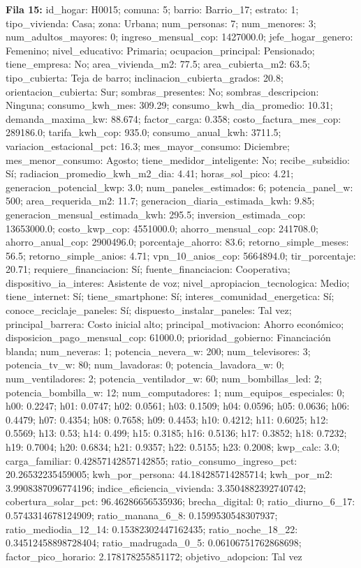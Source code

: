 {\footnotesize\textbf{Fila 15:} id\_hogar: H0015; comuna: 5; barrio: Barrio\_17; estrato: 1; tipo\_vivienda: Casa; zona: Urbana; num\_personas: 7; num\_menores: 3; num\_adultos\_mayores: 0; ingreso\_mensual\_cop: 1427000.0; jefe\_hogar\_genero: Femenino; nivel\_educativo: Primaria; ocupacion\_principal: Pensionado; tiene\_empresa: No; area\_vivienda\_m2: 77.5; area\_cubierta\_m2: 63.5; tipo\_cubierta: Teja de barro; inclinacion\_cubierta\_grados: 20.8; orientacion\_cubierta: Sur; sombras\_presentes: No; sombras\_descripcion: Ninguna; consumo\_kwh\_mes: 309.29; consumo\_kwh\_dia\_promedio: 10.31; demanda\_maxima\_kw: 88.674; factor\_carga: 0.358; costo\_factura\_mes\_cop: 289186.0; tarifa\_kwh\_cop: 935.0; consumo\_anual\_kwh: 3711.5; variacion\_estacional\_pct: 16.3; mes\_mayor\_consumo: Diciembre; mes\_menor\_consumo: Agosto; tiene\_medidor\_inteligente: No; recibe\_subsidio: Sí; radiacion\_promedio\_kwh\_m2\_dia: 4.41; horas\_sol\_pico: 4.21; generacion\_potencial\_kwp: 3.0; num\_paneles\_estimados: 6; potencia\_panel\_w: 500; area\_requerida\_m2: 11.7; generacion\_diaria\_estimada\_kwh: 9.85; generacion\_mensual\_estimada\_kwh: 295.5; inversion\_estimada\_cop: 13653000.0; costo\_kwp\_cop: 4551000.0; ahorro\_mensual\_cop: 241708.0; ahorro\_anual\_cop: 2900496.0; porcentaje\_ahorro: 83.6; retorno\_simple\_meses: 56.5; retorno\_simple\_anios: 4.71; vpn\_10\_anios\_cop: 5664894.0; tir\_porcentaje: 20.71; requiere\_financiacion: Sí; fuente\_financiacion: Cooperativa; dispositivo\_ia\_interes: Asistente de voz; nivel\_apropiacion\_tecnologica: Medio; tiene\_internet: Sí; tiene\_smartphone: Sí; interes\_comunidad\_energetica: Sí; conoce\_reciclaje\_paneles: Sí; dispuesto\_instalar\_paneles: Tal vez; principal\_barrera: Costo inicial alto; principal\_motivacion: Ahorro económico; disposicion\_pago\_mensual\_cop: 61000.0; prioridad\_gobierno: Financiación blanda; num\_neveras: 1; potencia\_nevera\_w: 200; num\_televisores: 3; potencia\_tv\_w: 80; num\_lavadoras: 0; potencia\_lavadora\_w: 0; num\_ventiladores: 2; potencia\_ventilador\_w: 60; num\_bombillas\_led: 2; potencia\_bombilla\_w: 12; num\_computadores: 1; num\_equipos\_especiales: 0; h00: 0.2247; h01: 0.0747; h02: 0.0561; h03: 0.1509; h04: 0.0596; h05: 0.0636; h06: 0.4479; h07: 0.4354; h08: 0.7658; h09: 0.4453; h10: 0.4212; h11: 0.6025; h12: 0.5569; h13: 0.53; h14: 0.499; h15: 0.3185; h16: 0.5136; h17: 0.3852; h18: 0.7232; h19: 0.7004; h20: 0.6834; h21: 0.9357; h22: 0.5155; h23: 0.2008; kwp\_calc: 3.0; carga\_familiar: 0.42857142857142855; ratio\_consumo\_ingreso\_pct: 20.26532235459005; kwh\_por\_persona: 44.184285714285714; kwh\_por\_m2: 3.9908387096774196; indice\_eficiencia\_vivienda: 3.3504882392740742; cobertura\_solar\_pct: 96.46286656535936; brecha\_digital: 0; ratio\_diurno\_6\_17: 0.5743314678124909; ratio\_manana\_6\_8: 0.1599530548307937; ratio\_mediodia\_12\_14: 0.15382302447162435; ratio\_noche\_18\_22: 0.34512458898728404; ratio\_madrugada\_0\_5: 0.06106751762868698; factor\_pico\_horario: 2.178178255851172; objetivo\_adopcion: Tal vez\par}
